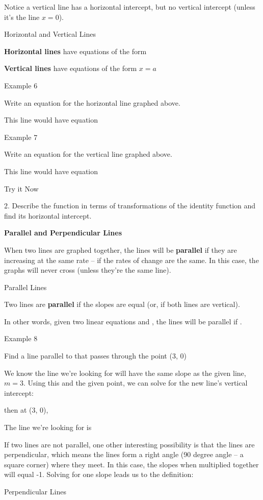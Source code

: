 Notice a vertical line has a horizontal intercept, but no vertical
intercept (unless it's the line $x = 0$).

Horizontal and Vertical Lines

\textbf{Horizontal lines} have equations of the form

\textbf{Vertical lines} have equations of the form $x = a$

Example 6

Write an equation for the horizontal line graphed above.

This line would have equation

Example 7

Write an equation for the vertical line graphed above.

This line would have equation

Try it Now

2. Describe the function in terms of transformations of the identity
function and find its horizontal intercept.

\textbf{Parallel and Perpendicular Lines}

When two lines are graphed together, the lines will be \textbf{parallel}
if they are increasing at the same rate -- if the rates of change are
the same. In this case, the graphs will never cross (unless they're the
same line).

Parallel Lines

Two lines are \textbf{parallel} if the slopes are equal (or, if both
lines are vertical).

In other words, given two linear equations and , the lines will be
parallel if .

Example 8

Find a line parallel to that passes through the point (3, 0)

We know the line we're looking for will have the same slope as the given
line, $m = 3$. Using this and the given point, we can solve for the
new line's vertical intercept:

then at (3, 0),

The line we're looking for is

If two lines are not parallel, one other interesting possibility is that
the lines are perpendicular, which means the lines form a right angle
(90 degree angle -- a square corner) where they meet. In this case, the
slopes when multiplied together will equal -1. Solving for one slope
leads us to the definition:

Perpendicular Lines

